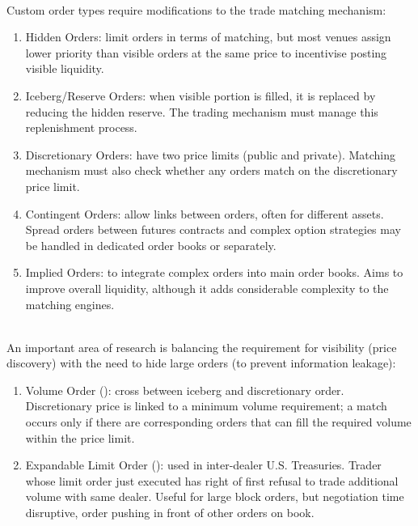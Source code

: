 \begin{remark} \\
Custom order types require modifications to the trade matching mechanism:
\begin{enumerate}[label=\roman*.]
\setlength{\itemsep}{0pt}
\item Hidden Orders: limit orders in terms of matching, but most venues assign lower priority than visible orders at the same price to incentivise posting visible liquidity.
\item Iceberg/Reserve Orders: when visible portion is filled, it is replaced by reducing the hidden reserve. The trading mechanism must manage this replenishment process.
\item Discretionary Orders: have two price limits (public and private). Matching mechanism must also check whether any orders match on the discretionary price limit.
\item Contingent Orders: allow links between orders, often for different assets. Spread orders between futures contracts and complex option strategies may be handled in dedicated order books or separately.
\item Implied Orders: to integrate complex orders into main order books. Aims to improve overall liquidity, although it adds considerable complexity to the matching engines.
\end{enumerate}
\end{remark}

\begin{remark} \\
An important area of research is balancing the requirement for visibility (price discovery) with the need to hide large orders (to prevent information leakage):
\begin{enumerate}[label=\roman*.]
\setlength{\itemsep}{0pt}
\item Volume Order (\cite{gomber_budimir_schweickert_2006}): cross between iceberg and discretionary order. Discretionary price is linked to a minimum volume requirement; a match occurs only if there are corresponding orders that can fill the required volume within the price limit.
\item Expandable Limit Order (\cite{boni_leach_2004}): used in inter-dealer U.S. Treasuries. Trader whose limit order just executed has right of first refusal to trade additional volume with same dealer. Useful for large block orders, but negotiation time disruptive, order pushing in front of other orders on book.
\end{enumerate}
\end{remark}

